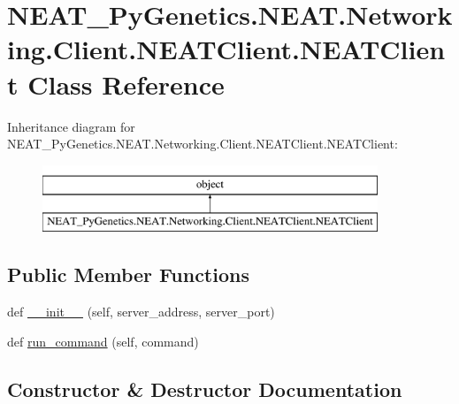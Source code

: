 \hypertarget{classNEAT__PyGenetics_1_1NEAT_1_1Networking_1_1Client_1_1NEATClient_1_1NEATClient}{}\section{N\+E\+A\+T\+\_\+\+Py\+Genetics.\+N\+E\+A\+T.\+Networking.\+Client.\+N\+E\+A\+T\+Client.\+N\+E\+A\+T\+Client Class Reference}
\label{classNEAT__PyGenetics_1_1NEAT_1_1Networking_1_1Client_1_1NEATClient_1_1NEATClient}
Inheritance diagram for N\+E\+A\+T\+\_\+\+Py\+Genetics.\+N\+E\+A\+T.\+Networking.\+Client.\+N\+E\+A\+T\+Client.\+N\+E\+A\+T\+Client\+:\begin{figure}[H]
\begin{center}
\leavevmode
\includegraphics[height=2.000000cm]{classNEAT__PyGenetics_1_1NEAT_1_1Networking_1_1Client_1_1NEATClient_1_1NEATClient}
\end{center}
\end{figure}
\subsection*{Public Member Functions}
\begin{DoxyCompactItemize}
\item 
def \hyperlink{classNEAT__PyGenetics_1_1NEAT_1_1Networking_1_1Client_1_1NEATClient_1_1NEATClient_a9e84283e9dab07424cbbef8d966fd74b}{\+\_\+\+\_\+init\+\_\+\+\_\+} (self, server\+\_\+address, server\+\_\+port)
\item 
def \hyperlink{classNEAT__PyGenetics_1_1NEAT_1_1Networking_1_1Client_1_1NEATClient_1_1NEATClient_a58156abc06c16b0f2399219655c7321c}{run\+\_\+command} (self, command)
\end{DoxyCompactItemize}


\subsection{Constructor \& Destructor Documentation}
